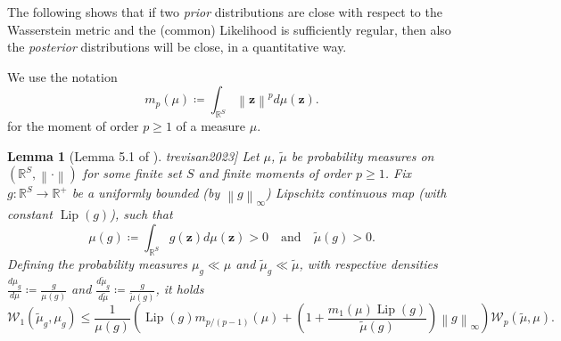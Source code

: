 \documentclass[a4paper, 11pt, reqno]{amsart}
\newcommand{\citet}[2][]{\citeauthor{#2} \cite[#1]{#2}}
\theoremstyle{plain}
\newtheorem{lemma}[theorem]{Lemma}
\theoremstyle{remark}
\theoremstyle{definition}
\newcommand{\mean}[2][\kern-0.5pt]{\mathbb{E}_{#1}\left[#2\right]}
\newcommand{\wass}[3][2]{\mathcal{W}_{#1}\left(#2, #3\right)}
\newcommand{\real}{\mathbb{R}}
\newcommand{\norm}[1]{\left\lVert#1\right\rVert}
\newcommand{\lipschitz}[1]{\operatorname{Lip}\left(#1\right)}
\begin{document}
The following  shows that if two \textit{prior} distributions are close with respect to the Wasserstein metric and the (common) Likelihood is sufficiently regular, then also the \textit{posterior} distributions will be close, in a quantitative way.

\smallskip

We use the notation
\begin{equation*}
	m_{p}(\mu) \coloneqq \int_{\real^S} \norm{\bm{z}}^{p} d \mu(\bm{z}).
\end{equation*}
for the moment of order $p \geq 1$ of a measure $\mu$.

\begin{lemma}[Lemma 5.1 of \citet{trevisan2023}] \label{lem:nnposterior}
	Let $\mu$, $\widetilde{\mu}$ be probability measures on $(\real^S, \norm{\cdot})$ for some finite set $S$ and finite moments of order $p \geq 1$.
	Fix $g: \real^S \to \real^+$ be a uniformly bounded (by $\norm{g}_\infty$) Lipschitz continuous map (with constant $\lipschitz{g}$), such that
	\begin{equation*}
		\mu(g) \coloneqq \int_{\real^S} g(\bm{z}) d\mu(\bm{z}) > 0 \quad \text{and} \quad \widetilde{\mu}(g) >0.
	\end{equation*}
	Defining the probability measures $\mu_g \ll \mu$ and $\widetilde{\mu}_g \ll \widetilde{\mu}$, with respective densities $\frac{d\mu_g}{d\mu} \coloneqq \frac{g}{\mu(g)}$ and $\frac{d\widetilde{\mu}_g}{d\widetilde{\mu}} \coloneqq \frac{g}{\widetilde{\mu}(g)}$, it holds
	\begin{equation} \label{eq:wassposterior}
		\wass[1]{\widetilde{\mu}_g}{\mu_g} \leq \frac{1}{\mu(g)} \left(\lipschitz{g} m_{p / (p - 1)}(\mu) + \left(1 + \frac{m_1(\mu) \lipschitz{g}}{\widetilde{\mu}(g)}\right) \norm{g}_{\infty}\right) \wass[p]{\widetilde{\mu}}{\mu}.
	\end{equation}
\end{lemma}
\end{document}
